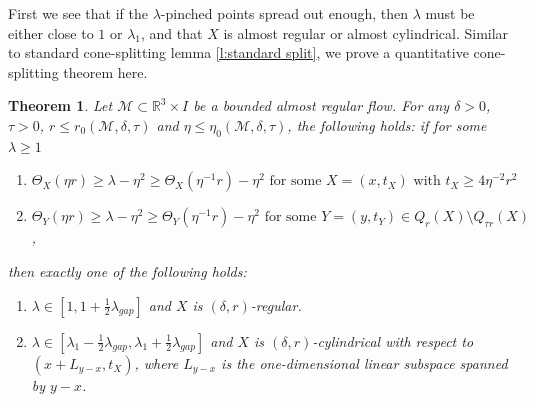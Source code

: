 \documentclass[11pt,reqno]{amsart}
\numberwithin{equation}{section}
\newcommand{\RR}{\mathds{R}}
\newcommand{\cM}{\mathcal{M}}
\newtheorem{theorem}[equation]{Theorem}
\theoremstyle{definition}
\theoremstyle{remark}
\theoremstyle{remark}
\theoremstyle{remark}
\theoremstyle{remark}\newtheorem{conjecture}[equation]{Conjecture}
\theoremstyle{remark}\newtheorem{question}[equation]{Question}
\begin{document}
First we see that if the $\lambda$-pinched points spread out enough, then $\lambda$ must be either close to $1$ or $\lambda_1$, and that $X$ is almost regular or almost cylindrical. Similar to standard cone-splitting lemma \ref{l:standard split}, we prove a quantitative cone-splitting theorem here.

\begin{theorem}\label{t:Quant split}
Let $\cM \subset \RR^3 \times I$ be a bounded almost regular flow. For any $\delta>0$, $\tau>0$, $r\le r_0(\cM,\delta,\tau)$ and $\eta\le \eta_0(\cM,\delta,\tau)$, the following holds: if for some $\lambda\ge 1$
\begin{enumerate}
    \item $\Theta_X(\eta r) \ge \lambda - \eta^2 \ge \Theta_X(\eta^{-1}r) - \eta^2 \text{ for some } X=(x,t_X) \text{ with } t_X \ge 4\eta^{-2}r^2$
\item $\Theta_Y(\eta r) \ge \lambda - \eta^2 \ge \Theta_Y(\eta^{-1}r) - \eta^2 \text{ for some } Y=(y,t_Y) \in Q_{r}(X)\setminus Q_{\tau r}(X)$,
\end{enumerate}
then exactly one of the following holds:
\begin{enumerate}
    \item $\lambda \in [1,1+ \frac{1}{2}\lambda_{gap}]$ and $X$ is $(\delta,r)$-regular.
    \item $\lambda \in [\lambda_1-\frac{1}{2}\lambda_{gap},\lambda_1+\frac{1}{2}\lambda_{gap}]$ and $X$ is $(\delta,r)$-cylindrical with respect to $(x+L_{y-x},t_X)$, where $L_{y-x}$ is the one-dimensional linear subspace spanned by $y-x$.
\end{enumerate}
\end{theorem}
\end{document}
